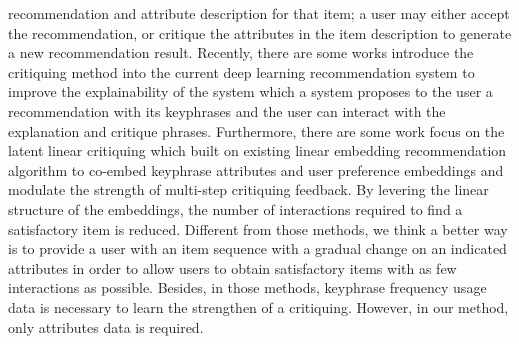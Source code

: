 recommendation and attribute description for that item; a user
may either accept the recommendation, or critique the attributes
in the item description to generate a new recommendation result\cite{tou1982rabbit}. Recently, there are some works introduce the critiquing method into the current deep learning recommendation system to improve the explainability of the system\cite{antognini2020interacting} which a system proposes to the user a recommendation with its keyphrases and the user can interact with the explanation and critique phrases. Furthermore, there are some work focus on the latent linear critiquing\cite{luo2020latent, luo2020deep} which built on  existing linear embedding recommendation
algorithm to co-embed keyphrase attributes and user preference embeddings and modulate the strength of multi-step critiquing feedback. By levering the linear structure of the embeddings, the number of interactions required to find a satisfactory item is reduced. Different from those methods, we think a better way is to provide a user with an item sequence with a gradual change on an indicated attributes in order to allow users to obtain satisfactory items with as few interactions as possible. Besides, in those methods, keyphrase frequency usage data is necessary to learn the strengthen of a critiquing. However, in our method, only attributes data is required.